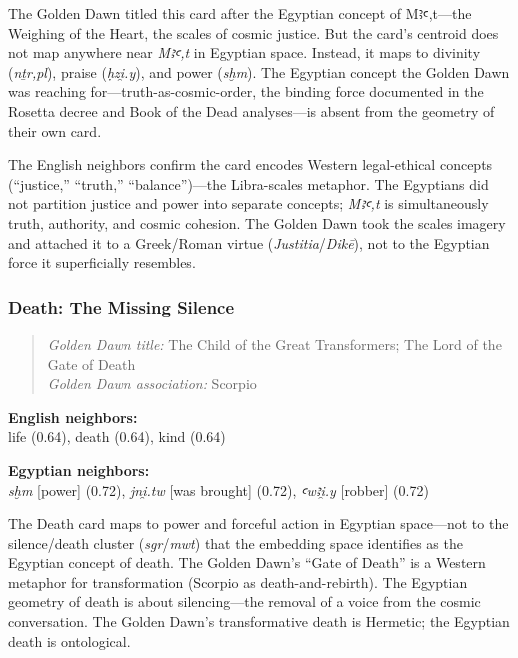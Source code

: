 \documentclass[11pt, a4paper]{article}
\begin{document}
\vspace{6pt}
 The Golden Dawn titled this card after the Egyptian concept of Mꜣꜥ,t---the Weighing of the Heart, the scales of cosmic justice. But the card's centroid does not map anywhere near \textit{Mꜣꜥ,t} in Egyptian space. Instead, it maps to divinity (\textit{nṯr,pl}), praise (\textit{ḥzi̯.y}), and power (\textit{sḫm}). The Egyptian concept the Golden Dawn was reaching for---truth-as-cosmic-order, the binding force documented in the Rosetta decree and Book of the Dead analyses---is absent from the geometry of their own card.

The English neighbors confirm the card encodes Western legal-ethical concepts (``justice,'' ``truth,'' ``balance'')---the Libra-scales metaphor. The Egyptians did not partition justice and power into separate concepts; \textit{Mꜣꜥ,t} is simultaneously truth, authority, and cosmic cohesion. The Golden Dawn took the scales imagery and attached it to a Greek/Roman virtue (\textit{Justitia}/\textit{Dikē}), not to the Egyptian force it superficially resembles.

\subsubsection{Death: The Missing Silence}

\begin{quote}
\textit{Golden Dawn title:} The Child of the Great Transformers; The Lord of the Gate of Death \\
\textit{Golden Dawn association:} Scorpio
\end{quote}

\noindent\textbf{English neighbors:}\\
\hspace{1em}life (0.64), death (0.64), kind (0.64)

\noindent\textbf{Egyptian neighbors:}\\
\hspace{1em}\textit{sḫm} [power] (0.72), \textit{jni̯.tw} [was brought] (0.72), \textit{ꜥwꜣi̯.y} [robber] (0.72)

\vspace{6pt}
 The Death card maps to power and forceful action in Egyptian space---not to the silence/death cluster (\textit{sgr}/\textit{mwt}) that the embedding space identifies as the Egyptian concept of death. The Golden Dawn's ``Gate of Death'' is a Western metaphor for transformation (Scorpio as death-and-rebirth). The Egyptian geometry of death is about silencing---the removal of a voice from the cosmic conversation. The Golden Dawn's transformative death is Hermetic; the Egyptian death is ontological.
\end{document}
